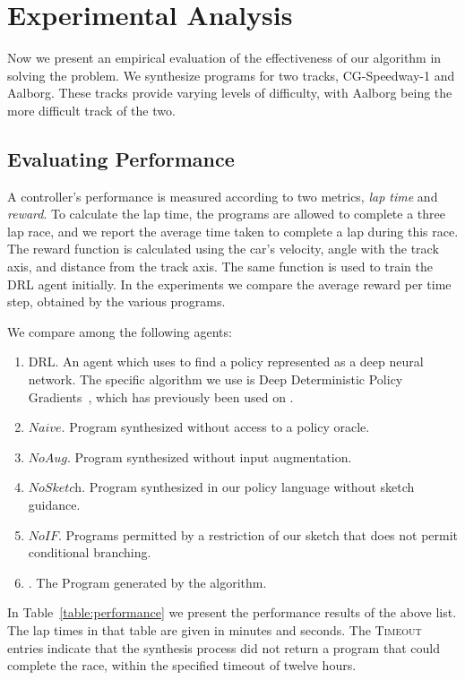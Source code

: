 \section{Experimental Analysis}
\label{sec:evaluation}
Now we present an empirical evaluation of the effectiveness of our algorithm in solving the \sygurl problem. We synthesize programs for two \torcs tracks, CG-Speedway-1 and Aalborg. These tracks provide varying levels of difficulty, with Aalborg being the more difficult track of the two.

\subsection{Evaluating Performance}
A controller's performance is measured according to two metrics, \textit{lap time} and \textit{reward}. To calculate the lap time, the programs are allowed to complete a three lap race, and we report the average time taken to complete a lap during this race. The reward function is calculated using the car's velocity, angle with the track axis, and distance from the track axis. The same function is used to train the DRL agent initially. In the experiments we compare the average reward per time step, obtained by the various programs. 

We compare among the following \rl agents:
\begin{enumerate}[label=A\arabic*:]
	\item \textsc{DRL}. An agent which uses \drl to find a policy
	represented as a deep neural
	network. The specific \drl algorithm we use is Deep
	Deterministic Policy Gradients~\citep{ddpg}, which has
	previously been used on \torcs.  
	\item $\textit{Naive}$. Program synthesized without access to a policy oracle. 
	\item $\textit{NoAug}$. Program synthesized without input augmentation.
	\item $\textit{NoSketch}$. Program synthesized in our policy language without sketch guidance.
	\item $\textit{NoIF}$. Programs permitted by a restriction of
          our sketch that does not permit conditional branching.
	\item \algo. The Program generated by the \algo algorithm.
\end{enumerate}

In Table~\ref{table:performance} we present the performance results of the above list. The lap times in that table are given in minutes and seconds. The \textsc{Timeout} entries indicate that the synthesis process did not return a program that could complete the race, within the specified timeout of twelve hours.

